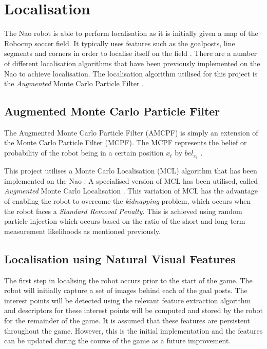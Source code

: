 \documentclass{report}
\begin{document}
\chapter{Localisation}
\label{sec:localisation}
The Nao robot is able to perform localisation as it is initially given a map of the Robocup soccer field. It typically uses features such as the goalposts, line segments and corners in order to localise itself on the field \cite{Bhuman}. There are a number of different localisation algorithms that have been previously implemented on the Nao to achieve localisation. The localisation algorithm utilised for this project is the \textit{Augmented} Monte Carlo Particle Filter \cite{Laue}.

\section{Augmented Monte Carlo Particle Filter}
\label{sec:amcpf}
The Augmented Monte Carlo Particle Filter (AMCPF) is simply an extension of the Monte Carlo Particle Filter (MCPF). The MCPF represents the belief or probability of the robot being in a certain position $x_t$ by $bel_{x_t}$ \cite{Thrun2002}. 


This project utilises a Monte Carlo Localisation (MCL) algorithm that has been implemented on the Nao \cite{Bhuman}. A specialised version of MCL has been utilised, called \textit{Augmented} Monte Carlo Localisation \cite{Laue}. This variation of MCL has the advantage of enabling the robot to overcome the \textit{kidnapping} problem, which occurs when the robot faces a \textit{Standard Removal Penalty}. This is achieved using random particle injection which occurs based on the ratio of the short and long-term measurement likelihoods as mentioned previously.\\

\section{Localisation using Natural Visual Features}
\label{sec:localisationNaturalVisualFeatures}
The first step in localising the robot occurs prior to the start of the game. The robot will initially capture a set of images behind each of the goal posts. The interest points will be detected using the relevant feature extraction algorithm and descriptors for these interest points will be computed and stored by the robot for the remainder of the game. It is assumed that these features are persistent throughout the game. However, this is the initial implementation and the features can be updated during the course of the game as a future improvement.\\
\end{document}
